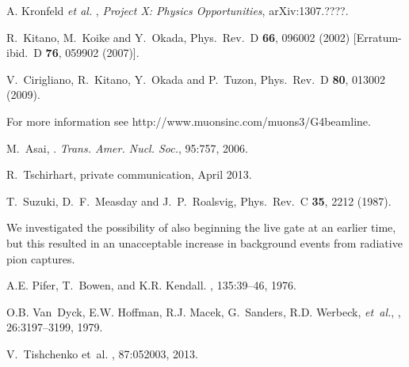 \begin{thebibliography}{99}
 A. Kronfeld {\it et al.} , 
  {\it{Project X: Physics Opportunities}}, arXiv:1307.????.

  R.~Kitano, M.~Koike and Y.~Okada,
  Phys.\ Rev.\ D {\bf 66}, 096002 (2002)
  [Erratum-ibid.\ D {\bf 76}, 059902 (2007)].

  V.~Cirigliano, R.~Kitano, Y.~Okada and P.~Tuzon,
  Phys.\ Rev.\ D {\bf 80}, 013002 (2009).

 For more information see http://www.muonsinc.com/muons3/G4beamline.

M.~Asai,
.
\emph{Trans. Amer. Nucl. Soc.}, 95:757, 2006.

 R.~Tschirhart, private communication, April 2013.

  T.~Suzuki, D.~F.~Measday and J.~P.~Roalsvig,
  Phys.\ Rev.\ C {\bf 35}, 2212 (1987).

 We investigated the possibility of also
beginning the live gate at an earlier time, but this resulted in an
unacceptable increase in background events from radiative pion
captures.





A.E. Pifer, T.~Bowen, and K.R. Kendall.
, 135:39--46, 1976.

O.B. Van~Dyck, E.W. Hoffman, R.J. Macek, G.~Sanders, R.D. Werbeck, {\it et~al.},
, 26:3197--3199, 1979.

V.~Tishchenko et~al.
, 87:052003, 2013.


\end{thebibliography}
